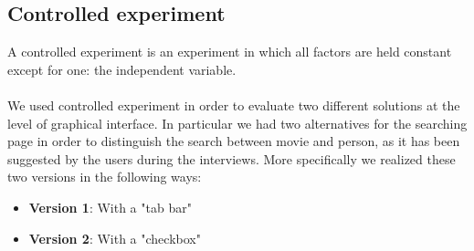 \documentclass[12pt, a4paper]{article}
\numberwithin{figure}{section}
\begin{document}
\subsection{Controlled experiment}

A controlled experiment is an experiment in which all factors are held constant except for one:
the independent variable.\\\\
We used  controlled experiment in order to evaluate two different solutions at the level of graphical interface.
In particular we had two alternatives for the searching page in order to distinguish the search between
movie and person, as it has been suggested by the users during the interviews.
More specifically we realized these two versions in the following ways:
\begin{itemize}
	\item \textbf{Version 1}: With a "tab bar"
	\item \textbf{Version 2}: With a "checkbox"
\end{itemize}
\end{document}
